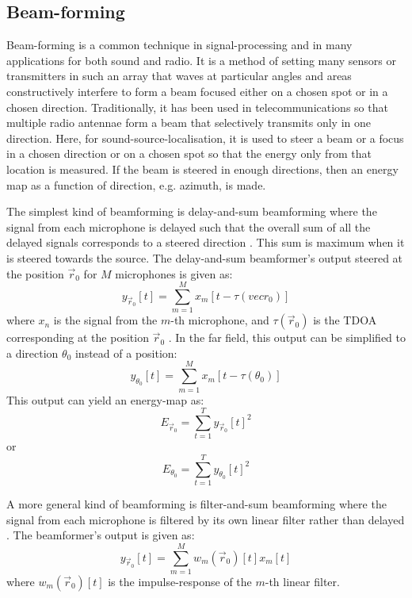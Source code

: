 \documentclass{report}
\begin{document}
\subsection{Beam-forming}

Beam-forming is a common technique in signal-processing and in many applications for both sound and radio. It is a method of setting many sensors or transmitters in such an array that waves at particular angles and areas constructively interfere to form a beam focused either on a chosen spot or in a chosen direction. Traditionally, it has been used in telecommunications so that multiple radio antennae form a beam that selectively transmits only in one direction. Here, for sound-source-localisation, it is used to steer a beam or a focus in a chosen direction or on a chosen spot so that the energy only from that location is measured. If the beam is steered in enough directions, then an energy map as a function of direction, e.g. azimuth, is made.

The simplest kind of beamforming is delay-and-sum beamforming where the signal from each microphone is delayed such that the overall sum of all the delayed signals corresponds to a steered direction \cite{rascon_localization_2017}. This sum is maximum when it is steered towards the source. The delay-and-sum beamformer's output steered at the position $\vec{r}_0$ for $M$ microphones is given as:
\begin{equation}
y_{\vec{r}_0}[t] = \sum_{m=1}^M x_m[t-\tau(vec{r}_0)] 
\end{equation}
where $x_n$ is the signal from the $m$-th microphone, and $\tau(\vec{r}_0)$ is the TDOA corresponding at the position $\vec{r}_0$ \cite{argentieri_survey_2015}. In the far field, this output can be simplified to a direction $\theta_0$ instead of a position:
\begin{equation}
y_{\theta_0}[t] = \sum_{m=1}^M x_m[t-\tau(\theta_0)] 
\end{equation}
This output can yield an energy-map as:
\begin{equation}
E_{\vec{r}_0} = \sum_{t=1}^T y_{\vec{r}_0}[t]^2
\end{equation}
or
\begin{equation}
E_{\theta_0} = \sum_{t=1}^T y_{\theta_0}[t]^2
\end{equation}

A more general kind of beamforming is filter-and-sum beamforming where the signal from each microphone is filtered by its own linear filter rather than delayed \cite{argentieri_survey_2015}. The beamformer's output is given as:
\begin{equation}
y_{\vec{r}_0}[t] = \sum_{m=1}^M w_m(\vec{r}_0)[t]x_m[t]
\end{equation} 
where $w_m(\vec{r}_0)[t]$ is the impulse-response of the $m$-th linear filter.
\end{document}

